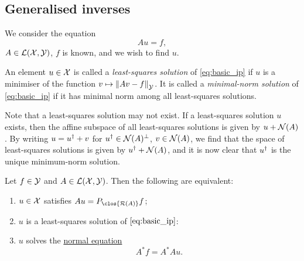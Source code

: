 \subsection{Generalised inverses}
We consider the equation \begin{equation} \label{eq:basic_ip}
    Au = f,
\end{equation} $A \in \mathcal L(\mathcal X, \mathcal Y)$, $f$ is known, and we wish to find $u$. 
\begin{definition}
    An element $u \in \mathcal X$ is called a \emph{least-squares solution} of \cref{eq:basic_ip} if $u$ is a minimiser of the function $v \mapsto \norm{Av - f}_\mathcal Y$. It is called a \emph{minimal-norm solution} of \cref{eq:basic_ip} if it has minimal norm among all least-squares solutions. 
\end{definition}

Note that a least-squares solution may not exist. If a least-squares solution $u$ exists, then the affine subspace of all least-squares solutions is given by $u + \operatorname{\mathcal N}(A)$. By writing $u = u^\dagger + v$ for $u^\dagger \in \operatorname{\mathcal N}(A)^\perp$, $v \in \operatorname{\mathcal N}(A)$, we find that the space of least-squares solutions is given by $u^\dagger + \operatorname{\mathcal N}(A)$, and it is now clear that $u^\dagger$ is the unique minimum-norm solution. 

\begin{theorem}
    Let $f \in \mathcal Y$ and $A \in \mathcal L(\mathcal X, \mathcal Y)$. Then the following are equivalent:
    \begin{enumerate}
        \item $u \in \mathcal X$ satisfies $Au = P_{\clos{\Ran(A)} }f$;
        \item $u$ is a least-squares solution of $\cref{eq:basic_ip}$:
        \item $u$ solves the \uline{normal equation}
        \begin{equation} \label{eq:normal}
                   A^* f = A^* A u. 
        \end{equation}
    \end{enumerate}
\end{theorem}

